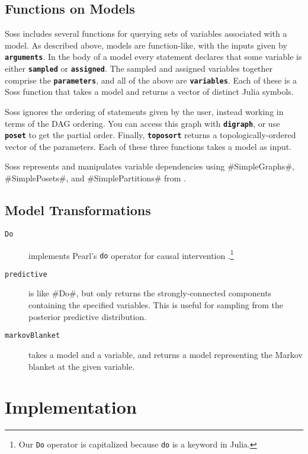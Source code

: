 \documentclass[anonymous=false, %
               format=acmsmall, %
               review=true, %
               screen=true, %
               nonacm=true]{acmart}
\begin{document}
\subsection{Functions on Models}

Soss includes several functions for querying sets of variables associated with a model. As described above, models are function-like, with the inputs given by {\bf \texttt{arguments}}. In the body of a model every statement declares that some variable is either {\bf \texttt{sampled}} or {\bf \texttt{assigned}}. The sampled and assigned variables together comprise the {\bf \texttt{parameters}}, and all of the above are {\bf \texttt{variables}}. Each of these is a Soss function that takes a model and returns a vector of distinct Julia symbols.

Soss ignores the ordering of statements given by the user, instead working in terms of the DAG ordering. You can access this graph with {\bf \texttt{digraph}}, or use {\bf \texttt{poset}} to get the partial order. Finally, {\bf \texttt{toposort}} returns a topologically-ordered vector of the parameters. Each of these three functions takes a model as input.

Soss represents and manipulates variable dependencies using \jl#SimpleGraphs#, \jl#SimplePosets#, and \jl#SimplePartitions# from \cite{SimpleWorld}.
 

\subsection{Model Transformations}

\begin{description}
    \item[\texttt{Do}] implements Pearl's {\footnotesize\texttt{do}} operator for causal intervention \cite{Pearl1995}.\footnote{Our {\footnotesize\texttt{Do}} operator is capitalized because {\footnotesize\texttt{do}} is a keyword in Julia.}
    \item[\texttt{predictive}] is like \jl#Do#, but only returns the strongly-connected components containing the specified variables. This is useful for sampling from the posterior predictive distribution.
    \item[\texttt{markovBlanket}]  takes a model and a variable, and returns a model representing the Markov blanket at the given variable.
\end{description}

\section{Implementation}
\end{document}
